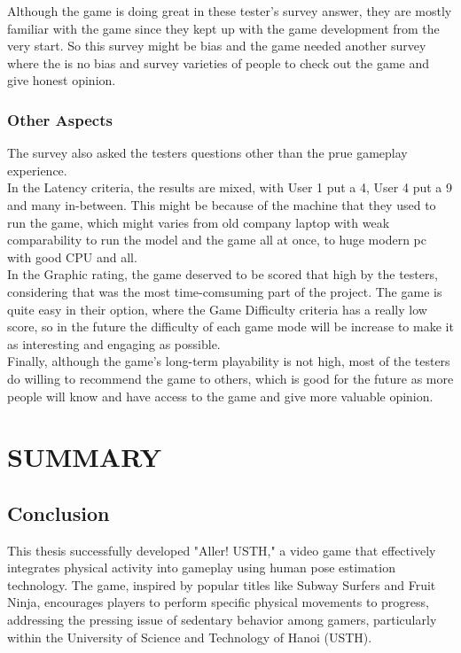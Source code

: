 \documentclass[12pt]{article}
\begin{document}
Although the game is doing great in these tester's survey answer, they are mostly familiar with the game since they kept up with the game development from the very start. So this survey might be bias and the game needed another survey where the is no bias and survey varieties of people to check out the game and give honest opinion.

\subsubsection{Other Aspects}
\hspace*{1.5em}The survey also asked the testers questions other than the prue gameplay experience.\\

In the Latency criteria, the results are mixed, with User 1 put a 4, User 4 put a 9 and many in-between. This might be because of the machine that they used to run the game, which might varies from old company laptop with weak comparability to run the model and the game all at once, to huge modern pc with good CPU and all.\\

In the Graphic rating, the game deserved to be scored that high by the testers, considering that was the most time-comsuming part of the project.
The game is quite easy in their option, where the Game Difficulty criteria has a really low score, so in the future the difficulty of each game mode will be increase to make it as interesting and engaging as possible.\\

Finally, although the game's long-term playability is not high, most of the testers do willing to recommend the game to others, which is good for the future as more people will know and have access to the game and give more valuable opinion.\\
\hspace*{1.5em}

\clearpage
\section{SUMMARY}
\subsection{Conclusion}
\hspace*{1.5em}This thesis successfully developed "Aller! USTH," a video game that effectively integrates physical activity into gameplay using human pose estimation technology. The game, inspired by popular titles like Subway Surfers and Fruit Ninja, encourages players to perform specific physical movements to progress, addressing the pressing issue of sedentary behavior among gamers, particularly within the University of Science and Technology of Hanoi (USTH).\\
\end{document}
